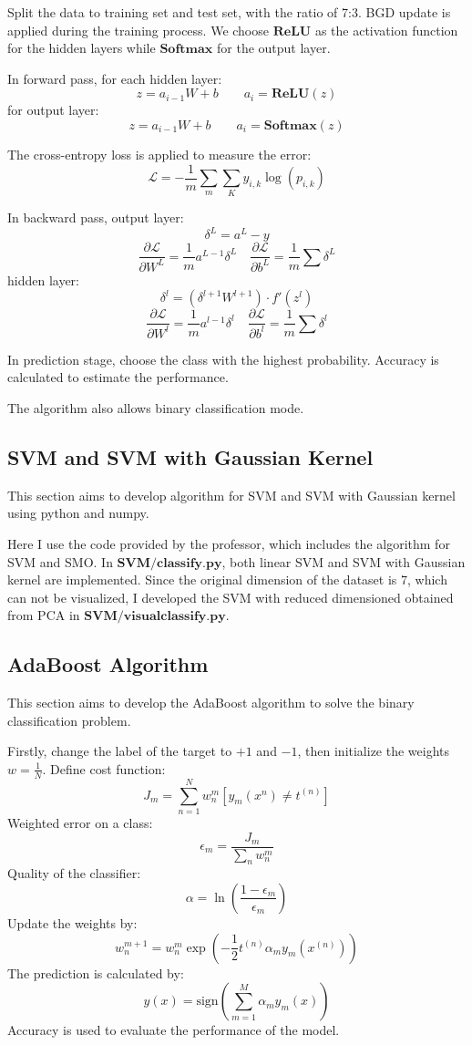 \documentclass{article}
\begin{document}
Split the data to training set and test set, with the ratio of 7:3. BGD update is applied during the training process. We choose $\mathbf{ReLU}$ as the activation function for the hidden layers while $\mathbf{Softmax}$ for the output layer.

In forward pass, for each hidden layer:
$$
z=a_{i-1}W+b \qquad a_i=\mathbf{ReLU}(z)
$$
for output layer:
$$
z=a_{i-1}W+b \qquad a_i=\mathbf{Softmax}(z)
$$

The cross-entropy loss is applied to measure the error:
$$
\mathcal{L}=-\frac{1}{m}\sum_{m}\sum_{K}y_{i,k}\log(p_{i,k})
$$

In backward pass, output layer:
$$
\delta^L=a^L-y
$$
$$
\frac{\partial \mathcal{L}}{\partial W^L} = \frac{1}{m}a^{L-1}\delta^L\quad \frac{\partial \mathcal{L}}{\partial b^L}=\frac{1}{m}\sum \delta^L
$$
hidden layer:
$$
\delta^l=(\delta^{l+1}W^{l+1})\cdot f'(z^l)
$$
$$
\frac{\partial \mathcal{L}}{\partial W^l}=\frac{1}{m}a^{l-1} \delta^l \quad \frac{\partial \mathcal{L}}{\partial b^l}=\frac{1}{m}\sum \delta^l
$$

In prediction stage, choose the class with the highest probability. Accuracy is calculated to estimate the performance.

The algorithm also allows binary classification mode.

\subsection{SVM and SVM with Gaussian Kernel}
This section aims to develop algorithm for SVM and SVM with Gaussian kernel using python and numpy.

Here I use the code provided by the professor, which includes the algorithm for SVM and SMO. In $\mathbf{SVM/classify.py}$, both linear SVM and SVM with Gaussian kernel are implemented. Since the original dimension of the dataset is 7, which can not be visualized, I developed the SVM with reduced dimensioned obtained from PCA in $\mathbf{SVM/visualclassify.py}$.

\subsection{AdaBoost Algorithm}
This section aims to develop the AdaBoost algorithm to solve the binary classification problem.

Firstly, change the label of the target to $+1$ and $-1$, then initialize the weights $w=\frac{1}{N}$. Define cost function:
$$
J_m=\sum_{n=1}^{N}w_n^m [y_m(x^n)\ne t^{(n)}]
$$
Weighted error on a class:
$$
\epsilon_m=\frac{J_m}{\sum_{n} w_n^m}
$$
Quality of the classifier:
$$
\alpha=\ln (\frac{1-\epsilon_m}{\epsilon_m})
$$
Update the weights by:
$$
w_n^{m+1}=w_n^m \exp (-\frac{1}{2} t^{(n)} \alpha_m y_m(x^{(n)}))
$$
The prediction is calculated by:
$$
y(x)=\text{sign}\left( \sum_{m=1}^{M} \alpha_m y_m(x) \right)
$$
Accuracy is used to evaluate the performance of the model.
\end{document}
